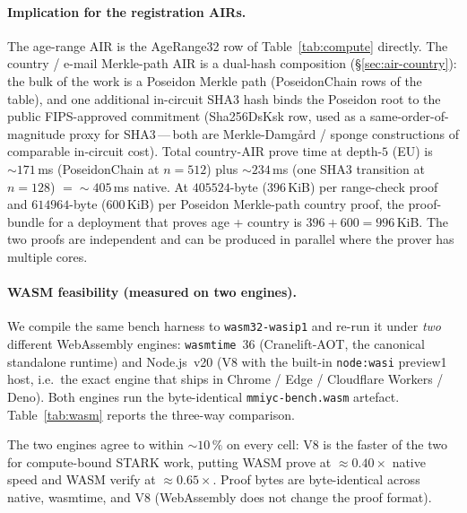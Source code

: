 \documentclass[11pt,a4paper]{article}
\begin{document}
\paragraph{Implication for the registration AIRs.}  The
age\nobreakdash-range AIR is the AgeRange32 row of
Table~\ref{tab:compute} directly.  The country / e\nobreakdash-mail
Merkle\nobreakdash-path AIR is a dual\nobreakdash-hash composition
(\S\ref{sec:air-country}): the bulk of the work is a Poseidon
Merkle path (PoseidonChain rows of the table), and one additional
in\nobreakdash-circuit SHA3 hash binds the Poseidon root to the
public FIPS\nobreakdash-approved commitment (Sha256DsKsk row,
used as a same\nobreakdash-order\nobreakdash-of\nobreakdash-magnitude
proxy for SHA3\,—\,both are
Merkle\nobreakdash-Damg\aa{}rd / sponge constructions of comparable
in\nobreakdash-circuit cost).  Total country\nobreakdash-AIR
prove time at depth\nobreakdash-$5$ (EU)
is $\sim\!\num{171}$\,ms (PoseidonChain at $n=512$) plus
$\sim\!\num{234}$\,ms (one SHA3 transition at $n=128$) $=
\sim\!\num{405}$\,ms native.  At
$\num{405524}$\nobreakdash-byte (\num{396}\,KiB) per
range\nobreakdash-check proof and $\num{614964}$\nobreakdash-byte
($\num{600}$\,KiB) per Poseidon Merkle\nobreakdash-path
country proof, the proof\nobreakdash-bundle for a deployment that
proves age + country is $\num{396} + \num{600} =
\num{996}$\,KiB.  The two proofs are independent and can be
produced in parallel where the prover has multiple cores.

\paragraph{WASM feasibility (measured on two engines).}  We
compile the same bench harness to \texttt{wasm32-wasip1} and
re\nobreakdash-run it under \emph{two} different WebAssembly
engines: \texttt{wasmtime}~36 (Cranelift\nobreakdash-AOT, the
canonical standalone runtime) and Node.js~v20 (V8 with the
built\nobreakdash-in \texttt{node:wasi} preview1 host, i.e.\ the
exact engine that ships in Chrome / Edge / Cloudflare Workers /
Deno).  Both engines run the byte\nobreakdash-identical
\texttt{mmiyc-bench.wasm} artefact.  Table~\ref{tab:wasm}
reports the three\nobreakdash-way comparison.

The two engines agree to within $\sim\!10\,\%$ on every cell:
V8 is the faster of the two for compute\nobreakdash-bound STARK
work, putting WASM prove at $\approx\!0.40\times$ native speed
and WASM verify at $\approx\!0.65\times$.  Proof bytes are
byte\nobreakdash-identical across native, wasmtime, and V8
(WebAssembly does not change the proof format).
\end{document}
